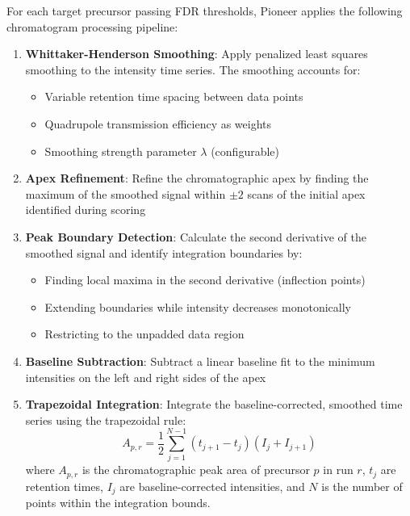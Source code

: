 \documentclass[pdflatex,sn-nature]{sn-jnl}
\begin{document}
For each target precursor passing FDR thresholds, Pioneer applies the following chromatogram processing pipeline:

\begin{enumerate}
    \item \textbf{Whittaker-Henderson Smoothing}: Apply penalized least squares smoothing \cite{Biessy2023-ix} to the intensity time series. The smoothing accounts for:
    \begin{itemize}
        \item Variable retention time spacing between data points
        \item Quadrupole transmission efficiency as weights
        \item Smoothing strength parameter $\lambda$ (configurable)
    \end{itemize}

    \item \textbf{Apex Refinement}: Refine the chromatographic apex by finding the maximum of the smoothed signal within $\pm 2$ scans of the initial apex identified during scoring

    \item \textbf{Peak Boundary Detection}: Calculate the second derivative of the smoothed signal and identify integration boundaries by:
    \begin{itemize}
        \item Finding local maxima in the second derivative (inflection points)
        \item Extending boundaries while intensity decreases monotonically
        \item Restricting to the unpadded data region
    \end{itemize}

    \item \textbf{Baseline Subtraction}: Subtract a linear baseline fit to the minimum intensities on the left and right sides of the apex

    \item \textbf{Trapezoidal Integration}: Integrate the baseline-corrected, smoothed time series using the trapezoidal rule:
    \begin{equation}
        A_{p,r} = \frac{1}{2}\sum_{j=1}^{N-1} (t_{j+1} - t_j)(I_j + I_{j+1})
    \end{equation}
    where $A_{p,r}$ is the chromatographic peak area of precursor $p$ in run $r$, $t_j$ are retention times, $I_j$ are baseline-corrected intensities, and $N$ is the number of points within the integration bounds.
\end{enumerate}
\end{document}
